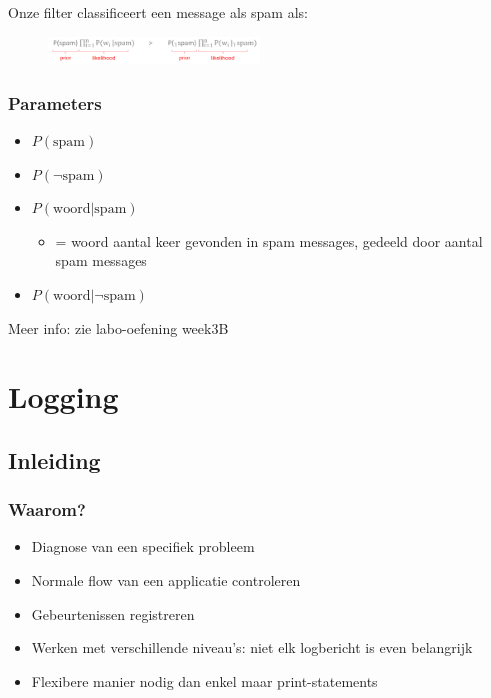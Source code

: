 \documentclass{article}
\begin{document}
Onze filter classificeert een message als spam als:

\begin{figure}[H]
    \centering
    \includegraphics[width=0.5\textwidth]{bayes-spam2.png}
    \caption{}
\end{figure}

\subsubsection{Parameters}

\begin{itemize}
    \item $P(\text{spam})$
    \item $P(\neg \text{spam})$
    \item $P(\text{woord}|\text{spam})$
    \begin{itemize}
        \item = woord aantal keer gevonden in spam messages, gedeeld door aantal spam messages
    \end{itemize}
    \item $P(\text{woord}|\neg \text{spam})$
\end{itemize}

Meer info: zie labo-oefening week3B


\section{Logging}

\subsection{Inleiding}

\subsubsection{Waarom?}

\begin{itemize}
    \item Diagnose van een specifiek probleem
    \item Normale flow van een applicatie controleren
    \item Gebeurtenissen registreren
    \item Werken met verschillende niveau's: niet elk logbericht is even belangrijk
    \item Flexibere manier nodig dan enkel maar print-statements
\end{itemize}
\end{document}
